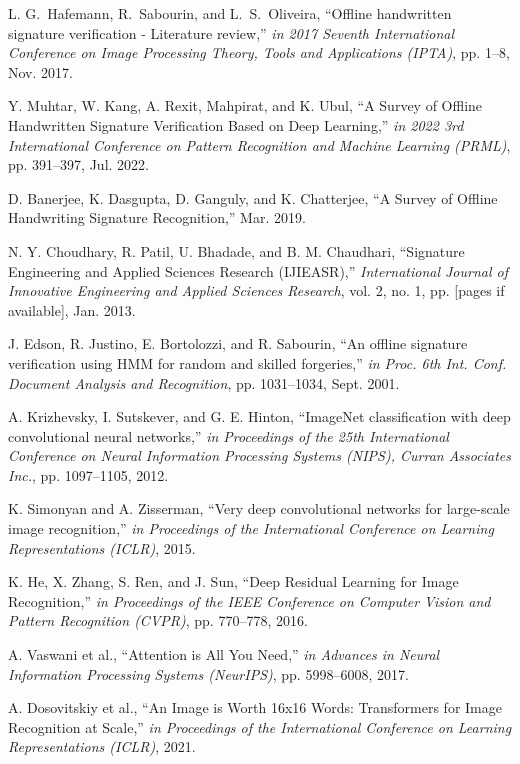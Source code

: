 \documentclass{article}
\begin{document}
\begin{thebibliography}{10}

	L. G.~Hafemann, R.~Sabourin, and L.~S.~Oliveira,
	``Offline handwritten signature verification - Literature review,''
	\emph{in 2017 Seventh International Conference on Image Processing Theory, Tools and Applications (IPTA)},
	pp. 1--8, Nov. 2017.

	Y. Muhtar, W. Kang, A. Rexit, Mahpirat, and K. Ubul,
	``A Survey of Offline Handwritten Signature Verification Based on Deep Learning,''
	\emph{in 2022 3rd International Conference on Pattern Recognition and Machine Learning (PRML)},
	pp. 391--397, Jul. 2022.

	D. Banerjee, K. Dasgupta, D. Ganguly, and K. Chatterjee,
	``A Survey of Offline Handwriting Signature Recognition,''
	Mar. 2019.

	N. Y. Choudhary, R. Patil, U. Bhadade, and B. M. Chaudhari,
	``Signature Engineering and Applied Sciences Research (IJIEASR),''
	\emph{International Journal of Innovative Engineering and Applied Sciences Research},
	vol. 2, no. 1, pp. [pages if available], Jan. 2013.

	J. Edson, R. Justino, E. Bortolozzi, and R. Sabourin,
	``An offline signature verification using HMM for random and skilled forgeries,''
	\emph{in Proc. 6th Int. Conf. Document Analysis and Recognition},
	pp. 1031--1034, Sept. 2001.

	A. Krizhevsky, I. Sutskever, and G. E. Hinton,
	``ImageNet classification with deep convolutional neural networks,''
	\emph{in Proceedings of the 25th International Conference on Neural Information Processing Systems (NIPS), Curran Associates Inc.},
	pp. 1097--1105, 2012.

	K. Simonyan and A. Zisserman,
	``Very deep convolutional networks for large-scale image recognition,''
	\emph{in Proceedings of the International Conference on Learning Representations (ICLR)},
	2015.

	K. He, X. Zhang, S. Ren, and J. Sun,
	``Deep Residual Learning for Image Recognition,''
	\emph{in Proceedings of the IEEE Conference on Computer Vision and Pattern Recognition (CVPR)},
	pp. 770--778, 2016.

	A. Vaswani et al.,
	``Attention is All You Need,''
	\emph{in Advances in Neural Information Processing Systems (NeurIPS)},
	pp. 5998--6008, 2017.

	A. Dosovitskiy et al.,
	``An Image is Worth 16x16 Words: Transformers for Image Recognition at Scale,''
	\emph{in Proceedings of the International Conference on Learning Representations (ICLR)},
	2021.


\end{thebibliography}
\end{document}
